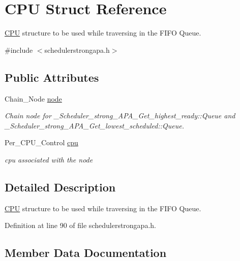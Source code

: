 \hypertarget{structCPU}{}\section{C\+PU Struct Reference}
\label{structCPU}


\hyperlink{structCPU}{C\+PU} structure to be used while traversing in the F\+I\+FO Queue.  




{\ttfamily \#include $<$schedulerstrongapa.\+h$>$}

\subsection*{Public Attributes}
\begin{DoxyCompactItemize}
\item 
Chain\+\_\+\+Node \hyperlink{structCPU_a52476a7d08b3ede8a92c40857d33dc8a}{node}
\begin{DoxyCompactList}\small\item\em Chain node for \+\_\+\+Scheduler\+\_\+strong\+\_\+\+A\+P\+A\+\_\+\+Get\+\_\+highest\+\_\+ready\+::\+Queue and \+\_\+\+Scheduler\+\_\+strong\+\_\+\+A\+P\+A\+\_\+\+Get\+\_\+lowest\+\_\+scheduled\+::\+Queue. \end{DoxyCompactList}\item 
Per\+\_\+\+C\+P\+U\+\_\+\+Control \hyperlink{structCPU_afd8a0102a88a2213b4cfa3c88526b6ca}{cpu}
\begin{DoxyCompactList}\small\item\em cpu associated with the node \end{DoxyCompactList}\end{DoxyCompactItemize}


\subsection{Detailed Description}
\hyperlink{structCPU}{C\+PU} structure to be used while traversing in the F\+I\+FO Queue. 

Definition at line 90 of file schedulerstrongapa.\+h.



\subsection{Member Data Documentation}
\mbox{\label{structCPU_afd8a0102a88a2213b4cfa3c88526b6ca}} 
